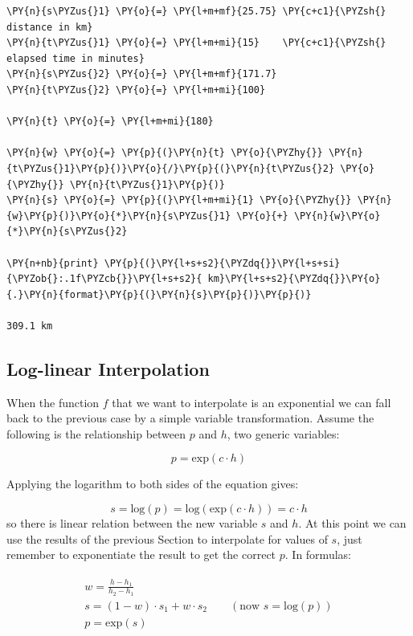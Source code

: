 \begin{codebox}
\begin{Verbatim}[commandchars=\\\{\}]
\PY{n}{s\PYZus{}1} \PY{o}{=} \PY{l+m+mf}{25.75} \PY{c+c1}{\PYZsh{} distance in km}
\PY{n}{t\PYZus{}1} \PY{o}{=} \PY{l+m+mi}{15}    \PY{c+c1}{\PYZsh{} elapsed time in minutes}
\PY{n}{s\PYZus{}2} \PY{o}{=} \PY{l+m+mf}{171.7}
\PY{n}{t\PYZus{}2} \PY{o}{=} \PY{l+m+mi}{100}

\PY{n}{t} \PY{o}{=} \PY{l+m+mi}{180}

\PY{n}{w} \PY{o}{=} \PY{p}{(}\PY{n}{t} \PY{o}{\PYZhy{}} \PY{n}{t\PYZus{}1}\PY{p}{)}\PY{o}{/}\PY{p}{(}\PY{n}{t\PYZus{}2} \PY{o}{\PYZhy{}} \PY{n}{t\PYZus{}1}\PY{p}{)}
\PY{n}{s} \PY{o}{=} \PY{p}{(}\PY{l+m+mi}{1} \PY{o}{\PYZhy{}} \PY{n}{w}\PY{p}{)}\PY{o}{*}\PY{n}{s\PYZus{}1} \PY{o}{+} \PY{n}{w}\PY{o}{*}\PY{n}{s\PYZus{}2}

\PY{n+nb}{print} \PY{p}{(}\PY{l+s+s2}{\PYZdq{}}\PY{l+s+si}{\PYZob{}:.1f\PYZcb{}}\PY{l+s+s2}{ km}\PY{l+s+s2}{\PYZdq{}}\PY{o}{.}\PY{n}{format}\PY{p}{(}\PY{n}{s}\PY{p}{)}\PY{p}{)}

309.1 km
\end{Verbatim}
\end{codebox}

\subsection{Log-linear Interpolation}\label{log-linear-interpolation}
When the function $f$ that we want to interpolate is an exponential we can fall back to the previous case by a simple variable transformation. 
Assume the following is the relationship between $p$ and $h$, two generic variables:

\begin{equation}
p = \mathrm{exp}(c \cdot h)
\end{equation}

Applying the logarithm to both sides of the equation gives:

\begin{equation}
s = \mathrm{log}(p) = \mathrm{log}(\mathrm{exp}(c \cdot h)) = c \cdot h
\end{equation}
so there is linear relation between the new variable $s$ and $h$. At this point we can use the results of the previous Section to interpolate for values of $s$, just remember to exponentiate the result to get the correct $p$. In formulas:

\begin{align}
\label{eq:log_interp}
\begin{gathered}
w = \frac{h - h_1}{h_2 - h_1} \\
s = (1 - w)\cdot s_1 + w \cdot s_2\qquad (\textrm{now } s = \textrm{log}(p))\\
p = \textrm{exp}(s)
\end{gathered}
\end{align}

